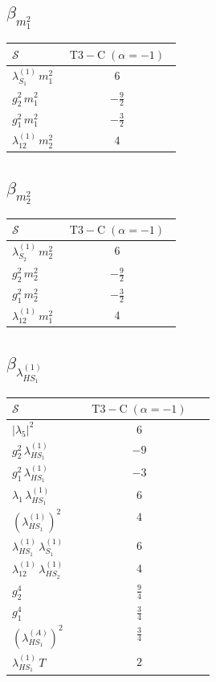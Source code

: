 \documentclass[9pt]{article}
\begin{document}
\subsection*{$ \beta_{m_1^{2}} $}
\begin{longtable}{@{}p{0.31\linewidth}c@{}}
\toprule
$\mathcal{S}$ & $ \mathrm{T3-C}\;(\alpha=-1) $ \\
\midrule
$ \lambda_{S_1}^{(1)}\,m_1^{2} $ & $ 6 $ \\
$ g_2^2\,m_1^{2} $ & $ - \frac{9}{2} $ \\
$ g_1^2\,m_1^{2} $ & $ - \frac{3}{2} $ \\
$ \lambda_{12}^{(1)}\,m_2^{2} $ & $ 4 $ \\
\bottomrule
\end{longtable}
\subsection*{$ \beta_{m_2^{2}} $}
\begin{longtable}{@{}p{0.31\linewidth}c@{}}
\toprule
$\mathcal{S}$ & $ \mathrm{T3-C}\;(\alpha=-1) $ \\
\midrule
$ \lambda_{S_2}^{(1)}\,m_2^{2} $ & $ 6 $ \\
$ g_2^2\,m_2^{2} $ & $ - \frac{9}{2} $ \\
$ g_1^2\,m_2^{2} $ & $ - \frac{3}{2} $ \\
$ \lambda_{12}^{(1)}\,m_1^{2} $ & $ 4 $ \\
\bottomrule
\end{longtable}
\subsection*{$ \beta_{\lambda_{HS_1}^{(1)}} $}
\begin{longtable}{@{}p{0.31\linewidth}c@{}}
\toprule
$\mathcal{S}$ & $ \mathrm{T3-C}\;(\alpha=-1) $ \\
\midrule
$ |\lambda_5|^2 $ & $ 6 $ \\
$ g_2^2\,\lambda_{HS_1}^{(1)} $ & $ -9 $ \\
$ g_1^2\,\lambda_{HS_1}^{(1)} $ & $ -3 $ \\
$ \lambda_1\,\lambda_{HS_1}^{(1)} $ & $ 6 $ \\
$ \left(\lambda_{HS_1}^{(1)}\right)^2 $ & $ 4 $ \\
$ \lambda_{HS_1}^{(1)}\,\lambda_{S_1}^{(1)} $ & $ 6 $ \\
$ \lambda_{12}^{(1)}\,\lambda_{HS_2}^{(1)} $ & $ 4 $ \\
$ g_2^4 $ & $ \frac{9}{4} $ \\
$ g_1^4 $ & $ \frac{3}{4} $ \\
$ \left(\lambda_{HS_1}^{(A)}\right)^2 $ & $ \frac{3}{4} $ \\
$ \lambda_{HS_1}^{(1)}\,T $ & $ 2 $ \\
\bottomrule
\end{longtable}
\end{document}
